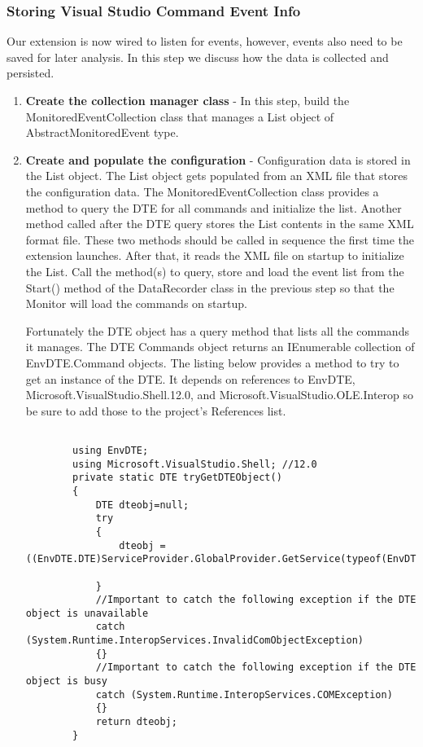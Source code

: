 \subsubsection{Storing Visual Studio Command Event Info}

Our extension is now wired to listen for events, however, events also need to be saved for later analysis. In this step we discuss how the data is collected and persisted.

\begin{enumerate}
\item {\bf Create the collection manager class} -
In this step, build the MonitoredEventCollection class that manages a List object of AbstractMonitoredEvent type.  

\item {\bf Create and populate the configuration} -
Configuration data is stored in the List object.
The List object gets populated from an XML file that stores the configuration data.  The MonitoredEventCollection class provides a method to query the DTE for all commands and initialize the list.  
Another method called after the DTE query stores the List contents in the same XML format file.  These two methods should be called in sequence the first time the extension launches. After that, it  reads the XML file on startup to initialize the List.  Call the method(s) to query, store and load the event list from the Start() method of the DataRecorder class in the previous step so that the Monitor will load the commands on startup.

Fortunately the DTE object has a query method that lists all the commands it manages.   The DTE Commands object returns an IEnumerable collection of EnvDTE.Command objects. The listing below provides a method to try to get an instance of the DTE.  It depends on references to EnvDTE, Microsoft.VisualStudio.Shell.12.0, and Microsoft.VisualStudio.OLE.Interop so be sure to add those to the project's References list.

\begin{lstlisting}

		using EnvDTE;
		using Microsoft.VisualStudio.Shell; //12.0
		private static DTE tryGetDTEObject()
		{
			DTE dteobj=null;
			try
			{
				dteobj = ((EnvDTE.DTE)ServiceProvider.GlobalProvider.GetService(typeof(EnvDTE.DTE).GUID)).DTE;

			}
			//Important to catch the following exception if the DTE object is unavailable
			catch (System.Runtime.InteropServices.InvalidComObjectException)
			{} 
			//Important to catch the following exception if the DTE object is busy
			catch (System.Runtime.InteropServices.COMException)
			{}
			return dteobj;
		}


\end{lstlisting}
\end{enumerate}
